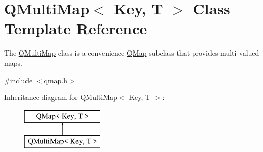 \hypertarget{class_q_multi_map}{}\section{Q\+Multi\+Map$<$ Key, T $>$ Class Template Reference}
\label{class_q_multi_map}


The \hyperlink{class_q_multi_map}{Q\+Multi\+Map} class is a convenience \hyperlink{class_q_map}{Q\+Map} subclass that provides multi-\/valued maps.  




{\ttfamily \#include $<$qmap.\+h$>$}

Inheritance diagram for Q\+Multi\+Map$<$ Key, T $>$\+:\begin{figure}[H]
\begin{center}
\leavevmode
\includegraphics[height=2.000000cm]{class_q_multi_map}
\end{center}
\end{figure}
